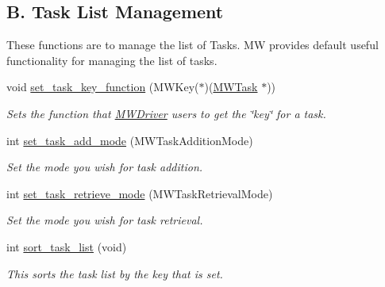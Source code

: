 \subsection*{B. Task List Management}
\label{_amgrp38670e45ec2f524a92bf9b971b068861}%
These functions are to manage the list of Tasks. MW provides default useful functionality for managing the list of tasks. \begin{DoxyCompactItemize}
\item 
\mbox{\label{classMWDriver_abe90c9016afecc9bf9b68d4b9f3ba3b7}} 
void \hyperlink{classMWDriver_abe90c9016afecc9bf9b68d4b9f3ba3b7}{set\+\_\+task\+\_\+key\+\_\+function} (M\+W\+Key($\ast$)(\hyperlink{classMWTask}{M\+W\+Task} $\ast$))
\begin{DoxyCompactList}\small\item\em Sets the function that \hyperlink{classMWDriver}{M\+W\+Driver} users to get the \char`\"{}key\char`\"{} for a task. \end{DoxyCompactList}\item 
\mbox{\label{classMWDriver_ae31fcd35f6e798994a2419db39f9f743}} 
int \hyperlink{classMWDriver_ae31fcd35f6e798994a2419db39f9f743}{set\+\_\+task\+\_\+add\+\_\+mode} (M\+W\+Task\+Addition\+Mode)
\begin{DoxyCompactList}\small\item\em Set the mode you wish for task addition. \end{DoxyCompactList}\item 
\mbox{\label{classMWDriver_a5d413e43dbd55fdc211f0aebdd51ac47}} 
int \hyperlink{classMWDriver_a5d413e43dbd55fdc211f0aebdd51ac47}{set\+\_\+task\+\_\+retrieve\+\_\+mode} (M\+W\+Task\+Retrieval\+Mode)
\begin{DoxyCompactList}\small\item\em Set the mode you wish for task retrieval. \end{DoxyCompactList}\item 
\mbox{\label{classMWDriver_a69e6f72bc04a6c68046a41bc4292bf64}} 
int \hyperlink{classMWDriver_a69e6f72bc04a6c68046a41bc4292bf64}{sort\+\_\+task\+\_\+list} (void)
\begin{DoxyCompactList}\small\item\em This sorts the task list by the key that is set. \end{DoxyCompactList}\item 

\end{DoxyCompactItemize}
